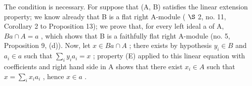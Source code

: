 The condition is necessary. For suppose that (A, B) satisfies the linear extension property; we know already that B is a flat right A-module ( \(\S\) 2, no. 11, Corollary 2 to Proposition 13); we prove that, for every left ideal a of A, \(Ba \cap A = a\) , which shows that B is a faithfully flat right A-module (no. 5, Proposition 9, (d)). Now, let \(x \in Ba \cap A\) ; there exists by hypothesis \(y_i \in B\) and \(a_i \in a\) such that \(\sum_{i} y_i a_i = x\) ; property (E) applied to this linear equation with coefficients and right hand side in A shows that there exist \(x_i \in A\) such that \(x = \sum_{i} x_i a_i\) , hence \(x \in a\) .

